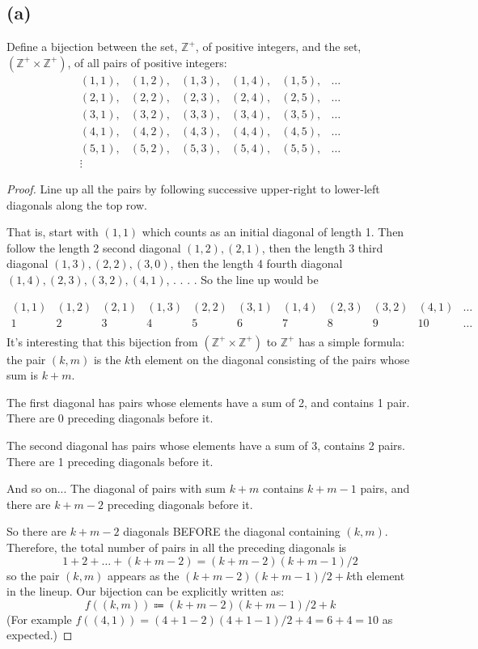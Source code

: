 \documentclass[14pt]{extarticle}
\begin{document}
\subsection{(a)}
Define a bijection between the set, $\mathbb{Z}^+$, of positive integers, and the set, $(\mathbb{Z}^+ \times \mathbb{Z}^+)$, of all pairs of positive integers:
$$
\begin{array}{cccccc}
(1,1),&(1,2),&(1,3),&(1,4),&(1,5),&\ldots\\
(2,1),&(2,2),&(2,3),&(2,4),&(2,5),&\ldots\\
(3,1),&(3,2),&(3,3),&(3,4),&(3,5),&\ldots\\
(4,1),&(4,2),&(4,3),&(4,4),&(4,5),&\ldots\\
(5,1),&(5,2),&(5,3),&(5,4),&(5,5),&\ldots\\
\vdots
\end{array}
$$

\begin{proof}
Line up all the pairs by following successive upper-right to lower-left diagonals along the top row.

That is, start with $(1,1)$ which counts as an initial diagonal of length 1. Then follow the length 2 second diagonal $(1,2), (2,1)$, then the length 3 third diagonal $(1,3), (2,2), (3,0)$, then the length 4 fourth diagonal $(1,4), (2,3), (3,2), (4,1)$, . . . . So the line up would be

$$
\begin{array}{ccccccccccc}
(1,1)&(1,2)&(2,1)&(1,3)&(2,2)&(3,1)&(1,4)&(2,3)&(3,2)&(4,1)&\ldots\\
1&2&3&4&5&6&7&8&9&10&\ldots\\
\end{array}
$$
It’s interesting that this bijection from $(\mathbb{Z}^+ \times \mathbb{Z}^+)$ to $\mathbb{Z}^+$ has a simple formula: the pair $(k, m)$ is the $k$th element on the diagonal consisting of the pairs whose sum is $k + m$. 

The first diagonal has pairs whose elements have a sum of 2, and contains 1 pair. There are 0 preceding diagonals before it.

The second diagonal has pairs whose elements have a sum of 3, contains 2 pairs. There are 1 preceding diagonals before it.

And so on... The diagonal of pairs with sum $k+m$ contains $k+m-1$ pairs, and there are $k+m-2$ preceding diagonals before it.

So there are $k+m-2$ diagonals BEFORE the diagonal containing $(k,m)$. Therefore, the total number of pairs in all the preceding diagonals is
$$
1 + 2 + \ldots + (k + m - 2) = (k+m-2)(k+m-1)/2
$$
so the pair $(k, m)$ appears as the $(k+m-2)(k+m-1)/2 + k$th element in the lineup. Our bijection can be explicitly written as:
$$
f((k,m)) \Coloneqq (k+m-2)(k+m-1)/2 + k
$$
(For example $f((4,1)) = (4+1-2)(4+1-1)/2 + 4 = 6 + 4 = 10$ as expected.)
\end{proof}
\end{document}
